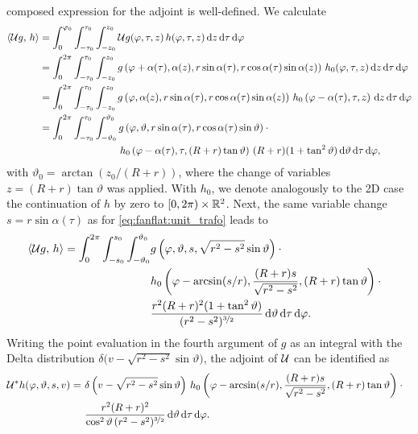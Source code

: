\documentclass{amsart}
\renewcommand*{\phi}{\varphi}
\begin{document}
composed expression for the adjoint is well-defined. We calculate
%
\begin{align*}
 \INNER{\OPU g}{h} 
 &= \int_0^{\phi_0} \int_{-\tau_0}^{\tau_0} \int_{-z_0}^{z_0} \OPU g(\phi, \tau, z)\, h(\phi, \tau, z)\, \D z\, \D\tau\, \D\phi \\
 &= \int_0^{2\pi} \int_{-\tau_0}^{\tau_0} \int_{-z_0}^{z_0} g\left( \phi + \alpha(\tau), \alpha(z), r\sin\alpha(\tau), r\cos\alpha(\tau) 
 \sin\alpha(z) \right)\, h_0(\phi, \tau, z)\, \D z\, \D\tau\, \D\phi \\
 &= \int_0^{2\pi} \int_{-\tau_0}^{\tau_0} \int_{-z_0}^{z_0} g\left( \phi, \alpha(z), r\sin\alpha(\tau), r\cos\alpha(\tau) 
 \sin\alpha(z) \right)\, h_0\left( \phi - \alpha(\tau), \tau, z \right)\, \D z\, \D\tau\, \D\phi \\
 &= \int_0^{2\pi} \int_{-\tau_0}^{\tau_0} \int_{-\vartheta_0}^{\vartheta_0} g\left( \phi, \vartheta, r\sin\alpha(\tau), r\cos\alpha(\tau) 
 \sin\vartheta \right) \cdot \phantom{x} \\ 
 & \hspace{80pt} h_0\left( \phi - \alpha(\tau), \tau, (R+r)\tan\vartheta \right)\, (R+r)(1+\tan^2\vartheta)\, \D \vartheta\, \D\tau\, 
 \D\phi,
\end{align*}
%
with $\vartheta_0 = \arctan(z_0/(R+r))$, where the change of variables $z = (R+r)\tan\vartheta$ was applied. With $h_0$, we denote 
analogously to the 2D case the continuation of $h$ by zero to $[0,2\pi)\times{\ensuremath{\mathbb{R}}}^2$. Next, the same variable change $s=r\sin\alpha(\tau)$ as 
for \eqref{eq:fanflat:unit_trafo} leads to
%
\begin{align*}
 \INNER{\OPU g}{h} 
 = \int_0^{2\pi} \int_{-s_0}^{s_0} \int_{-\vartheta_0}^{\vartheta_0} & g\left( \phi, \vartheta, s, \sqrt{r^2-s^2}\sin\vartheta \right)
 \cdot \phantom{x} \\ 
 & h_0\left( \phi - \arcsin(s/r), \frac{(R+r)s}{\sqrt{r^2-s^2}}, (R+r)\tan\vartheta \right) \cdot \phantom{x} \\
 &\frac{r^2(R+r)^2(1+\tan^2\vartheta)}{(r^2-s^2)^{\nicefrac{3}{2}}} \, \D \vartheta\, \D\tau\, \D\phi.
\end{align*}
%
Writing the point evaluation in the fourth argument of $g$ as an integral with the Delta distribution 
$\delta\big(v - \sqrt{r^2-s^2}\sin\vartheta\big)$, the adjoint of ${\mathcal{U}}$ can be identified as
%
\begin{align}
 \label{eq:coneflat:coord_op_adjoint}
 \OPU^*h(\phi,\vartheta,s,v) =\ &\delta\left( v - \sqrt{r^2-s^2}\sin\vartheta \right)\, 
 h_0\left( \phi - \arcsin(s/r), \frac{(R+r)s}{\sqrt{r^2-s^2}}, (R+r)\tan\vartheta \right) \cdot \phantom{x} \\
 &\frac{r^2(R+r)^2}{\cos^2\vartheta\, (r^2-s^2)^{\nicefrac{3}{2}}} \, \D \vartheta\, \D\tau\, \D\phi. \notag
\end{align}
\end{document}

